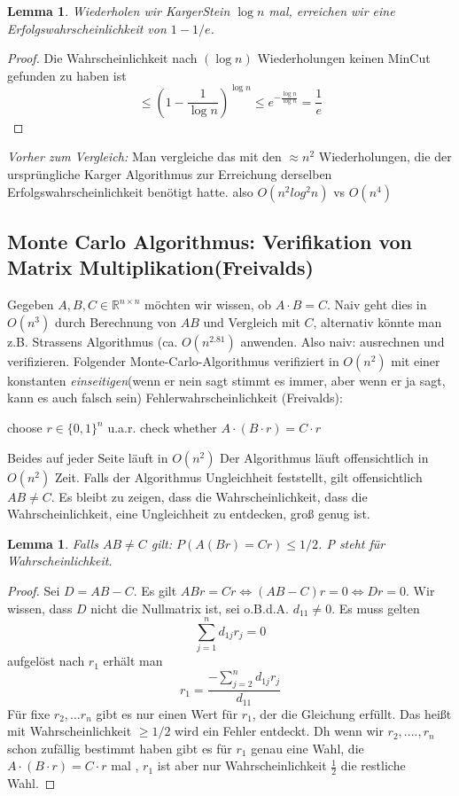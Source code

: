 \documentclass{article}
\newtheorem{lem}[thm]{Lemma}
\begin{document}
\begin{lem}
	Wiederholen wir KargerStein $\log n$ mal,  erreichen wir eine Erfolgswahrscheinlichkeit von $1-1/e$. 
\end{lem}
\begin{proof}
	Die Wahrscheinlichkeit nach $(\log n)$ Wiederholungen keinen MinCut gefunden zu haben ist
	\[
		\leq (1-\frac{1}{\log n})^{\log n}\leq e^{-\frac{\log n}{\log n}}=\frac{1}{e}
	\]
\end{proof}
\textit{Vorher zum Vergleich: }
Man vergleiche das mit den $\approx n^2$ Wiederholungen, die der ursprüngliche Karger Algorithmus zur Erreichung derselben Erfolgswahrscheinlichkeit benötigt hatte. also $O(n^2 log^2 n)$ vs $O(n^4)$

\subsection{Monte Carlo Algorithmus: Verifikation von Matrix Multiplikation(Freivalds)}
Gegeben $A,B,C \in \mathbb{R}^{n\times n}$ möchten wir wissen, ob $A\cdot B=C$. Naiv geht dies in $O(n^3)$ durch Berechnung von $AB$ und Vergleich mit $C$, alternativ könnte man z.B. Strassens Algorithmus (ca. $O(n^{2.81})$ anwenden.
Also naiv: ausrechnen und verifizieren.
Folgender Monte-Carlo-Algorithmus verifiziert in $O(n^2)$ mit einer konstanten \textit{ einseitigen}(wenn er nein sagt stimmt es immer, aber wenn er ja sagt, kann es auch falsch sein) Fehlerwahrscheinlichkeit (Freivalds):
\begin{algorithm}
	choose $r\in \{0,1\}^n$ u.a.r.\;
	check whether $A\cdot (B \cdot r)=C\cdot r$\;
\end{algorithm}
Beides auf jeder Seite läuft in $O(n^2)$ 
Der Algorithmus läuft offensichtlich in $O(n^2)$ Zeit. Falls der Algorithmus Ungleichheit feststellt, gilt offensichtlich $AB\neq C$. Es bleibt zu zeigen, dass die Wahrscheinlichkeit, dass die Wahrscheinlichkeit, eine  Ungleichheit zu entdecken, groß genug ist. 

\begin{lem}
	Falls $AB\neq C$ gilt: $P(A(Br)=Cr)\leq 1/2$. P steht für Wahrscheinlichkeit.
\end{lem}
\begin{proof}
	Sei $D=AB-C$. Es gilt $ABr=Cr \Leftrightarrow (AB-C)r=0  \Leftrightarrow Dr=0$.
	Wir wissen, dass $D$ nicht die Nullmatrix ist,  sei o.B.d.A. $d_{11}\neq 0$. Es muss gelten 
	\[
		\sum_{j=1}^{n} d_{1j} r_j =0
	\]
	aufgelöst nach $r_1$ erhält man
	\[
		r_1=\frac{-\sum_{j=2}^{n} d_{1j}r_j}{d_{11}}
	\]
	Für fixe $r_2, \dots r_n$ gibt es nur einen Wert für $r_1$, der die Gleichung erfüllt. Das heißt mit Wahrscheinlichkeit $\geq 1/2$ wird ein Fehler entdeckt.
    Dh wenn wir $r_2,...., r_n$ schon zufällig bestimmt haben gibt es für $r_1$ genau eine Wahl, die $A\cdot (B\cdot r) = C \cdot r$ mal , $r_1$ ist aber nur Wahrscheinlichkeit $\frac{1}{2}$ die restliche Wahl.
\end{proof}
\end{document}
